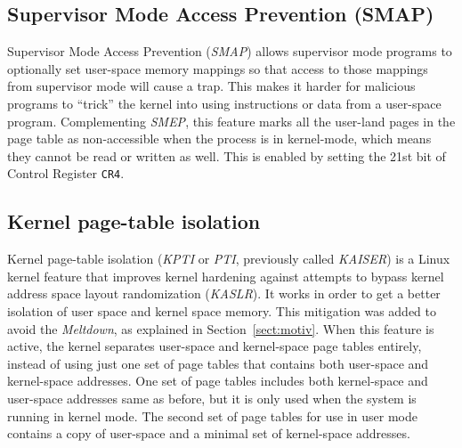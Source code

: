 \documentclass{masterthesis}
\newcommand{\refToSection}[1]{Section~\ref{sect:#1}\xspace}
\begin{document}
\subsection{Supervisor Mode Access Prevention (SMAP)}
\label{subsect:SMAP}
Supervisor Mode Access Prevention (\emph{SMAP}) allows supervisor mode programs to optionally set user-space memory mappings so that access to those mappings from supervisor mode will cause a trap. This makes it harder for malicious programs to ``trick'' the kernel into using instructions or data from a user-space program.
Complementing \emph{SMEP}, this feature marks all the user-land pages in the page table as non-accessible when the process is in kernel-mode, which means they cannot be read or written as well. This is enabled by setting the 21st bit of Control Register \texttt{CR4}.

\subsection{Kernel page-table isolation}
\label{subsect:KPTI}
Kernel page-table isolation (\emph{KPTI} or \emph{PTI}, previously called \emph{KAISER}) is a Linux kernel feature that improves kernel hardening against attempts to bypass kernel address space layout randomization (\emph{KASLR}). It works in order to get a better isolation of user space and kernel space memory.
This mitigation was added to avoid the \emph{Meltdown}, as explained in \refToSection{motiv}.
When this feature is active, the kernel separates user-space and kernel-space page tables entirely, instead of using just one set of page tables that contains both user-space and kernel-space addresses. One set of page tables includes both kernel-space and user-space addresses same as before, but it is only used when the system is running in kernel mode. The second set of page tables for use in user mode contains a copy of user-space and a minimal set of kernel-space addresses.
\end{document}
